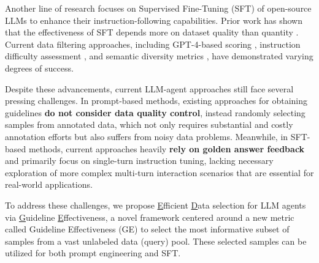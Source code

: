 Another line of research focuses on Supervised Fine-Tuning (SFT) of open-source LLMs to enhance their instruction-following capabilities. Prior work has shown that the effectiveness of SFT depends more on dataset quality than quantity \cite{wang-etal-2023-self-instruct,Zhou-Chunting-NeurIPS-2023-LIMA}. Current data filtering approaches, including GPT-4-based scoring \cite{Chen-Lichang-ICLR-2024-AlpaGasus}, instruction difficulty assessment \cite{Li-Ming-NAACL-2024-IFD}, and semantic diversity metrics \cite{lu-keming-ICLR-2024instag}, have demonstrated varying degrees of success.


Despite these advancements, current LLM-agent approaches still face several pressing challenges. In prompt-based methods, existing approaches for obtaining guidelines \textbf{do not consider data quality control}, instead randomly selecting samples from annotated data, which not only requires substantial and costly annotation efforts but also suffers from noisy data problems. Meanwhile, in SFT-based methods, current approaches heavily \textbf{rely on golden answer feedback} and primarily focus on single-turn instruction tuning, lacking necessary exploration of more complex multi-turn interaction scenarios that are essential for real-world applications.

To address these challenges, we propose \underline{E}fficient \underline{D}ata selection for LLM agents via \underline{G}uideline \underline{E}ffectiveness, a novel framework centered around a new metric called Guideline Effectiveness (GE) to select the most informative subset of samples from a vast unlabeled data (query) pool. These selected samples can be utilized for both prompt engineering and SFT. 

